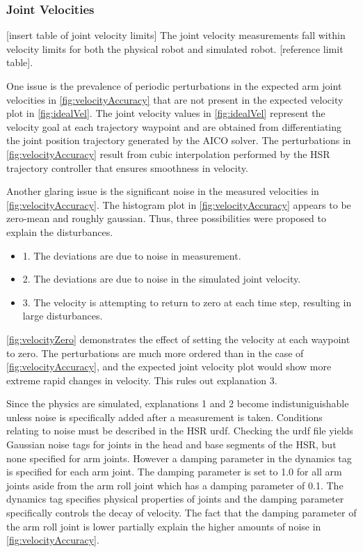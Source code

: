 \documentclass[12pt]{article}
\begin{document}
        \subsubsection{Joint Velocities}
            [insert table of joint velocity limits]
            The joint velocity measurements fall within velocity limits for both the physical robot and simulated robot. [reference limit table]. 
            \par One issue is the prevalence of periodic perturbations in the expected arm joint velocities in \cref{fig:velocityAccuracy} that are not present in the expected velocity plot in \cref{fig:idealVel}. The joint velocity values in \cref{fig:idealVel} represent the velocity goal at each trajectory waypoint and are obtained from differentiating the joint position trajectory generated by the AICO solver. The perturbations in \cref{fig:velocityAccuracy} result from cubic interpolation performed by the HSR trajectory controller that ensures smoothness in velocity.

            \par Another glaring issue is the significant noise in the measured velocities in \cref{fig:velocityAccuracy}. The histogram plot in \cref{fig:velocityAccuracy} appears to be zero-mean and roughly gaussian. Thus, three possibilities were proposed to explain the disturbances.
            \begin{itemize}
                \item 1. The deviations are due to noise in measurement.
                \item 2. The deviations are due to noise in the simulated joint velocity.
                \item 3. The velocity is attempting to return to zero at each time step, resulting in large disturbances.
            \end{itemize}

            \cref{fig:velocityZero} demonstrates the effect of setting the velocity at each waypoint to zero. The perturbations are much more ordered than in the case of \cref{fig:velocityAccuracy}, and the expected joint velocity plot would show more extreme rapid changes in velocity. This rules out explanation 3. 

            \par Since the physics are simulated, explanations 1 and 2 become indistuniguishable unless noise is specifically added after a measurement is taken. Conditions relating to noise must be described in the HSR urdf. Checking the urdf file yields Gaussian noise tags for joints in the head and base segments of the HSR, but none specified for arm joints. However a damping parameter in the dynamics tag is specified for each arm joint. The damping parameter is set to 1.0 for all arm joints aside from the arm roll joint which has a damping parameter of 0.1. The dynamics tag specifies physical properties of joints and the damping parameter specifically controls the decay of velocity. The fact that the damping parameter of the arm roll joint is lower partially explain the higher amounts of noise in \cref{fig:velocityAccuracy}.
\end{document}
